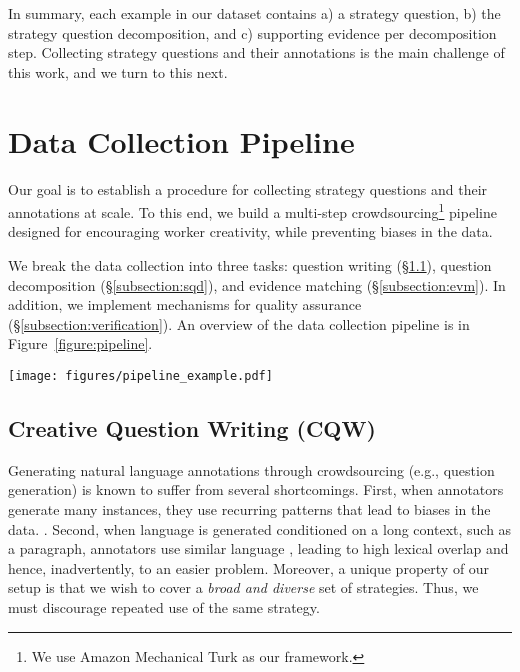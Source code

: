 {In summary, each example in our dataset contains a) a strategy question, b) the strategy question decomposition, and c) supporting evidence per decomposition step. %
Collecting strategy questions and their annotations is the main challenge of this work, and we turn to this next.

\section{Data Collection Pipeline}
\label{sec:data_collection}

Our goal is to establish a procedure
for collecting strategy questions and their annotations at scale. To this end, we build a multi-step crowdsourcing\footnote{We use Amazon Mechanical Turk as our framework.} pipeline designed for encouraging worker creativity, while preventing biases in the data.

We break the data collection into three tasks: question writing (\S\ref{subsection:cqw}), question decomposition (\S\ref{subsection:sqd}), and evidence matching (\S\ref{subsection:evm}). In addition, we implement mechanisms for quality assurance (\S\ref{subsection:verification}).
An overview of the data collection pipeline is in Figure~\ref{figure:pipeline}. 

\begin{figure*}
    \centering
    \texttt{[image: figures/pipeline\_example.pdf]}
    \vspace*{-2mm}
    \caption{Overview of the data collection pipeline. First (CQW, \S\ref{subsection:cqw}), a worker is presented with a term (T) and an expected answer (A) and writes a question (Q) and the facts (F1,F2) required to answer it. Next, the question is decomposed (SQD, \S\ref{subsection:sqd}) into steps (S1, S2) along with Wikipedia page titles (P1,P2) that the worker expects to find the answer in. Last (EVM, \S\ref{subsection:evm}), decomposition steps are matched with evidence from Wikipedia (E1, E2).
    }
    \label{figure:pipeline}
\end{figure*}

\subsection{Creative Question Writing (CQW)}
\label{subsection:cqw}

Generating natural language annotations  through crowdsourcing (e.g.,  question generation) is known to suffer from several shortcomings. First, when annotators generate many instances, they use recurring patterns that lead to biases in the data. \cite{gururangan2018annotation,geva2019modeling}.
Second, when language is generated conditioned on a long context, such as a paragraph, annotators use similar language \cite{kwiatkowski2019natural}, leading to high lexical overlap and hence, inadvertently, to an easier problem.    
Moreover, a unique property of our setup is that we wish to cover a \emph{broad and diverse} set of strategies. Thus, we must discourage repeated use of the same strategy. 

}
